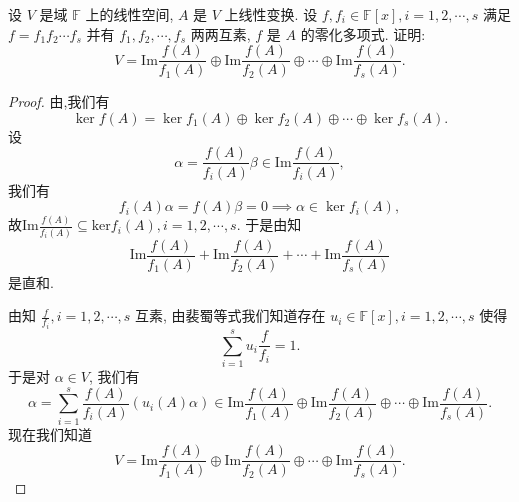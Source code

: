 \documentclass[../../main.tex]{subfiles}
\begin{document}
\begin{example}
设 $V$ 是域 $\mathbb{F}$ 上的线性空间, $A$ 是 $V$ 上线性变换. 设 $f, f_i \in \mathbb{F}[x], i = 1, 2, \cdots, s$ 满足 $f = f_1f_2\cdots f_s$ 并有 $f_1, f_2, \cdots, f_s$ 两两互素, $f$ 是 $A$ 的零化多项式. 证明:
$$
V = \mathrm{Im} \frac{f(A)}{f_1(A)} \oplus \mathrm{Im} \frac{f(A)}{f_2(A)} \oplus \cdots \oplus \mathrm{Im} \frac{f(A)}{f_s(A)}.
$$
\end{example}
\begin{proof}
由,我们有
$$
\ker f(A) = \ker f_1(A) \oplus \ker f_2(A) \oplus \cdots \oplus \ker f_s(A).
$$
设
$$
\alpha = \frac{f(A)}{f_i(A)} \beta \in \mathrm{Im} \frac{f(A)}{f_i(A)},
$$
我们有
$$
f_i(A) \alpha = f(A) \beta = 0 \implies \alpha \in \ker f_i(A),
$$
故$\mathrm{Im}\frac{f\left( A \right)}{f_i\left( A \right)}\subseteq \mathrm{ker}f_i\left( A \right) ,i=1,2,\cdots ,s.$
于是由知
$$
\mathrm{Im} \frac{f(A)}{f_1(A)} + \mathrm{Im} \frac{f(A)}{f_2(A)} + \cdots + \mathrm{Im} \frac{f(A)}{f_s(A)}
$$
是直和.

由知 $\frac{f}{f_i}, i = 1, 2, \cdots, s$ 互素, 由裴蜀等式我们知道存在 $u_i \in \mathbb{F}[x], i = 1, 2, \cdots, s$ 使得
$$
\sum_{i=1}^s u_i \frac{f}{f_i} = 1.
$$
于是对 $\alpha \in V$, 我们有
$$
\alpha = \sum_{i=1}^s \frac{f(A)}{f_i(A)} (u_i(A) \alpha) \in \mathrm{Im} \frac{f(A)}{f_1(A)} \oplus \mathrm{Im} \frac{f(A)}{f_2(A)} \oplus \cdots \oplus \mathrm{Im} \frac{f(A)}{f_s(A)}.
$$
现在我们知道
$$
V = \mathrm{Im} \frac{f(A)}{f_1(A)} \oplus \mathrm{Im} \frac{f(A)}{f_2(A)} \oplus \cdots \oplus \mathrm{Im} \frac{f(A)}{f_s(A)}.
$$
\end{proof}
\end{document}
